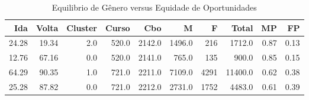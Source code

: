 \begin{table}
\centering
\caption{Equilibrio de Gênero versus Equidade de Oportunidades}
\label{tab:Salarios_Equidade}
\begin{tabular}{rrrrrrrrrr}
\toprule
  Ida &  Volta &  Cluster &  Curso &    Cbo &      M &    F &   Total &   MP &   FP \\
\midrule
24.28 &  19.34 &      2.0 &  520.0 & 2142.0 & 1496.0 &  216 &  1712.0 & 0.87 & 0.13 \\
12.76 &  67.16 &      0.0 &  520.0 & 2141.0 &  765.0 &  135 &   900.0 & 0.85 & 0.15 \\
64.29 &  90.35 &      1.0 &  721.0 & 2211.0 & 7109.0 & 4291 & 11400.0 & 0.62 & 0.38 \\
25.28 &  87.82 &      0.0 &  721.0 & 2212.0 & 2731.0 & 1752 &  4483.0 & 0.61 & 0.39 \\
\bottomrule
\end{tabular}
\end{table}
